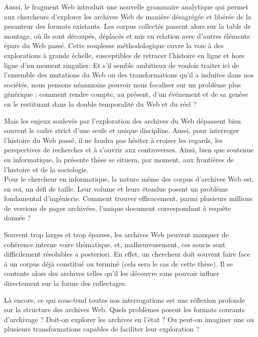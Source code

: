 \documentclass[symmetric,justified,marginals=raggedouter]{tufte-book}
\begin{document}
Aussi, le fragment Web introduit une nouvelle grammaire analytique qui permet aux chercheurs d'explorer les archives Web de manière désagrégée et libérée de la pesanteur des formats existants. Les corpus collectés passent alors sur la table de montage, où ils sont découpés, déplacés et mis en relation avec d'autres éléments épars du Web passé. Cette souplesse méthodologique ouvre la voie à des explorations à grande échelle, susceptibles de retracer l'histoire en ligne et hors ligne d'un moment singulier. Et s'il semble ambitieux de vouloir traiter ici de l'ensemble des mutations du Web ou des transformations qu'il a induites dans nos sociétés, nous pensons néanmoins pouvoir nous focaliser sur un problème plus générique : comment rendre compte, au présent, d'un événement et de sa genèse en le restituant dans la double temporalité du Web et du réel ?

Mais les enjeux soulevés par l'exploration des archives du Web dépassent bien souvent le cadre strict d'une seule et unique discipline. Aussi, pour interroger l'histoire du Web passé, il ne faudra pas hésiter à croiser les regards, les perspectives de recherches et à s'ouvrir aux controverses. Ainsi, bien que soutenue en informatique, la présente thèse se situera, par moment, aux frontières de l'histoire et de la sociologie.\\

\noindent Pour le chercheur en informatique, la nature même des corpus d'archives Web est, en soi, un défi de taille. Leur volume et leurs étendue posent un problème fondamental d'ingénierie. Comment trouver efficacement, parmi plusieurs millions de versions de pages archivées, l'unique document correspondant à requête donnée ? 

Souvent trop larges et trop éparses, les archives Web peuvent manquer de cohérence interne voire thématique, et, malheureusement, ces soucis sont difficilement résolubles a posteriori. En effet, un chercheur doit souvent faire face à un corpus déjà constitué ou terminé (cela sera le cas de cette thèse). Il se contente alors des archives telles qu'il les découvre sans pouvoir influer directement sur la forme des collectages. 

Là encore, ce qui sous-tend toutes nos interrogations est une réflexion profonde sur la structure des archives Web. Quels problèmes posent les formats courants d'archivage ? Doit-on explorer les archives en l'état ? Ou peut-on imaginer une ou plusieurs transformations capables de faciliter leur exploration ?\\
\end{document}
